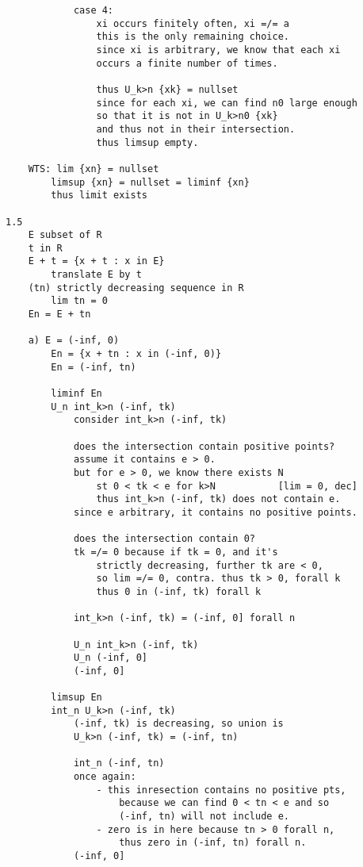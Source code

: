 \documentclass{article}
\begin{document}
\begin{flushleft}
\begin{verbatim}
            case 4: 
                xi occurs finitely often, xi =/= a
                this is the only remaining choice. 
                since xi is arbitrary, we know that each xi 
                occurs a finite number of times. 

                thus U_k>n {xk} = nullset 
                since for each xi, we can find n0 large enough 
                so that it is not in U_k>n0 {xk}
                and thus not in their intersection. 
                thus limsup empty. 

    WTS: lim {xn} = nullset 
        limsup {xn} = nullset = liminf {xn}
        thus limit exists 

1.5
    E subset of R 
    t in R 
    E + t = {x + t : x in E} 
        translate E by t 
    (tn) strictly decreasing sequence in R 
        lim tn = 0 
    En = E + tn 

    a) E = (-inf, 0)
        En = {x + tn : x in (-inf, 0)}
        En = (-inf, tn)
        
        liminf En 
        U_n int_k>n (-inf, tk)
            consider int_k>n (-inf, tk) 

            does the intersection contain positive points?
            assume it contains e > 0.
            but for e > 0, we know there exists N 
                st 0 < tk < e for k>N           [lim = 0, dec]
                thus int_k>n (-inf, tk) does not contain e.
            since e arbitrary, it contains no positive points.

            does the intersection contain 0?
            tk =/= 0 because if tk = 0, and it's 
                strictly decreasing, further tk are < 0,
                so lim =/= 0, contra. thus tk > 0, forall k 
                thus 0 in (-inf, tk) forall k 
                
            int_k>n (-inf, tk) = (-inf, 0] forall n 

            U_n int_k>n (-inf, tk) 
            U_n (-inf, 0]
            (-inf, 0]

        limsup En 
        int_n U_k>n (-inf, tk)
            (-inf, tk) is decreasing, so union is 
            U_k>n (-inf, tk) = (-inf, tn)

            int_n (-inf, tn) 
            once again: 
                - this inresection contains no positive pts, 
                    because we can find 0 < tn < e and so 
                    (-inf, tn) will not include e.
                - zero is in here because tn > 0 forall n, 
                    thus zero in (-inf, tn) forall n.
            (-inf, 0]
        

\end{verbatim}
\end{flushleft}
\end{document}
